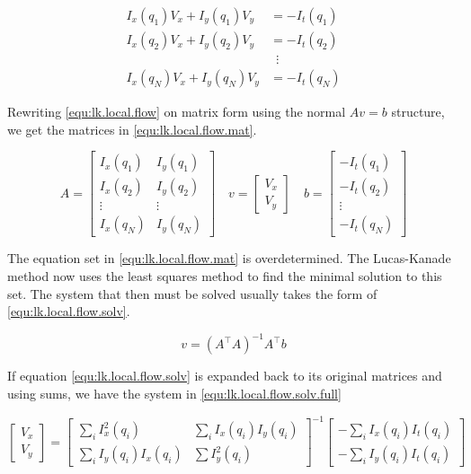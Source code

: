 \begin{equation}\label{equ:lk.local.flow}
	\begin{split}
		I_x(q_1)V_x + I_y(q_1)V_y	&= -I_t(q_1) \\
		I_x(q_2)V_x + I_y(q_2)V_y 	&= -I_t(q_2) \\
		&\,\,\, \vdots \\
		I_x(q_N)V_x + I_y(q_N)V_y 	&= -I_t(q_N)
	\end{split}
\end{equation}

Rewriting \eqref{equ:lk.local.flow} on matrix form using the normal $Av = b$ structure, we get the matrices in \eqref{equ:lk.local.flow.mat}.

\begin{equation} \label{equ:lk.local.flow.mat}
A = \begin{bmatrix}
		I_x(q_1) 	& I_y(q_1) \\
		I_x(q_2) 	& I_y(q_2) \\ 
		\vdots 		& \vdots \\
		I_x(q_N)	& I_y(q_N)
	\end{bmatrix} \quad 
v =	\begin{bmatrix}
		V_x \\ V_y
	\end{bmatrix} \quad
b = \begin{bmatrix}
		-I_t(q_1) \\ -I_t(q_2) \\ \vdots \\ -I_t(q_N)
	\end{bmatrix}
\end{equation}

The equation set in \eqref{equ:lk.local.flow.mat} is overdetermined. The Lucas-Kanade method now uses the 
least squares method to find the minimal solution to this set. The system that then must be solved usually takes the 
form of \eqref{equ:lk.local.flow.solv}.

\begin{equation}\label{equ:lk.local.flow.solv}
	v = \left(A^\top A\right)^{-1} A^\top b
\end{equation}

If equation \eqref{equ:lk.local.flow.solv} is expanded back to its original matrices and using sums, we have the system in \eqref{equ:lk.local.flow.solv.full}

\begin{equation}\label{equ:lk.local.flow.solv.full}
	\begin{bmatrix}
		V_x \\ V_y
	\end{bmatrix} = 
	\begin{bmatrix}
		\sum_ i{I_x^2(q_i)} 	 & \sum_i{I_x(q_i)I_y(q_i)} \\
		\sum_i{I_y(q_i)I_x(q_i)} & \sum{I_y^2(q_i)}
	\end{bmatrix}^{-1}
	\begin{bmatrix}
		-\sum_i{I_x(q_i)I_t(q_i)} \\ -\sum_i{I_y(q_i)I_t(q_i)}
	\end{bmatrix}
\end{equation}

